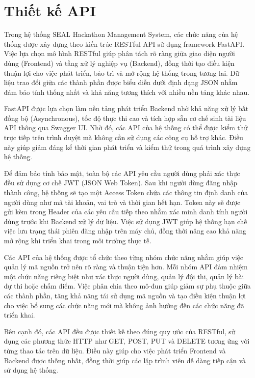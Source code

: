 \section{Thiết kế API}

Trong hệ thống SEAL Hackathon Management System, các chức năng của hệ thống được xây dựng theo kiến trúc RESTful API sử dụng framework FastAPI. Việc lựa chọn mô hình RESTful giúp phân tách rõ ràng giữa giao diện người dùng (Frontend) và tầng xử lý nghiệp vụ (Backend), đồng thời tạo điều kiện thuận lợi cho việc phát triển, bảo trì và mở rộng hệ thống trong tương lai. Dữ liệu trao đổi giữa các thành phần được biểu diễn dưới định dạng JSON nhằm đảm bảo tính thống nhất và khả năng tương thích với nhiều nền tảng khác nhau.

FastAPI được lựa chọn làm nền tảng phát triển Backend nhờ khả năng xử lý bất đồng bộ (Asynchronous), tốc độ thực thi cao và tích hợp sẵn cơ chế sinh tài liệu API thông qua Swagger UI. Nhờ đó, các API của hệ thống có thể được kiểm thử trực tiếp trên trình duyệt mà không cần sử dụng các công cụ hỗ trợ khác. Điều này giúp giảm đáng kể thời gian phát triển và kiểm thử trong quá trình xây dựng hệ thống.

Để đảm bảo tính bảo mật, toàn bộ các API yêu cầu người dùng phải xác thực đều sử dụng cơ chế JWT (JSON Web Token). Sau khi người dùng đăng nhập thành công, hệ thống sẽ tạo một Access Token chứa các thông tin định danh của người dùng như mã tài khoản, vai trò và thời gian hết hạn. Token này sẽ được gửi kèm trong Header của các yêu cầu tiếp theo nhằm xác minh danh tính người dùng trước khi Backend xử lý dữ liệu. Việc sử dụng JWT giúp hệ thống hạn chế việc lưu trạng thái phiên đăng nhập trên máy chủ, đồng thời nâng cao khả năng mở rộng khi triển khai trong môi trường thực tế.

Các API của hệ thống được tổ chức theo từng nhóm chức năng nhằm giúp việc quản lý mã nguồn trở nên rõ ràng và thuận tiện hơn. Mỗi nhóm API đảm nhiệm một chức năng riêng biệt như xác thực người dùng, quản lý đội thi, quản lý bài dự thi hoặc chấm điểm. Việc phân chia theo mô-đun giúp giảm sự phụ thuộc giữa các thành phần, tăng khả năng tái sử dụng mã nguồn và tạo điều kiện thuận lợi cho việc bổ sung các chức năng mới mà không ảnh hưởng đến các chức năng đã triển khai.

Bên cạnh đó, các API đều được thiết kế theo đúng quy ước của RESTful, sử dụng các phương thức HTTP như GET, POST, PUT và DELETE tương ứng với từng thao tác trên dữ liệu. Điều này giúp cho việc phát triển Frontend và Backend được thống nhất, đồng thời giúp các lập trình viên dễ dàng tiếp cận và sử dụng hệ thống.

